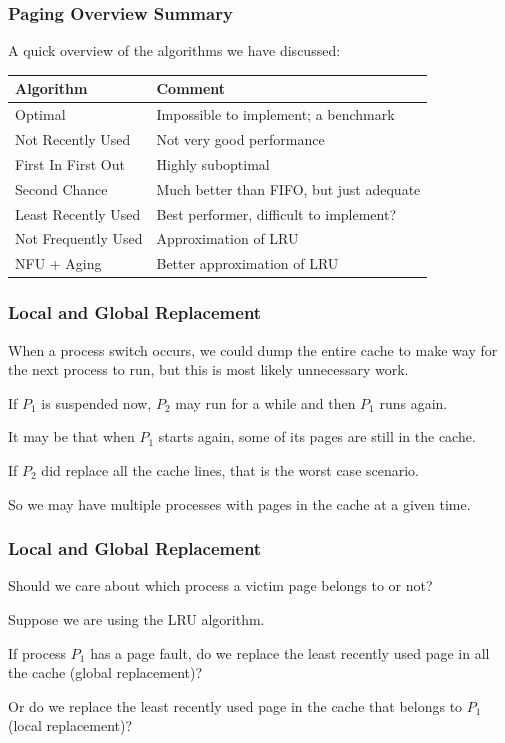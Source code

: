 \begin{frame}
\frametitle{Paging Overview Summary}

A quick overview of the algorithms we have discussed:

\begin{center}
\begin{tabular}{l|l}
	\textbf{Algorithm} & \textbf{Comment} \\ \hline
	Optimal & Impossible to implement; a benchmark\\
	Not Recently Used &  Not very good performance \\
	First In First Out & Highly suboptimal \\
	Second Chance & Much better than FIFO, but just adequate \\
	Least Recently Used & Best performer, difficult to implement? \\
	Not Frequently Used & Approximation of LRU \\
	NFU + Aging & Better approximation of LRU\\
\end{tabular}
\end{center}


\end{frame}

\begin{frame}
\frametitle{Local and Global Replacement}

When a process switch occurs, we could dump the entire cache to make way for the next process to run, but this is most likely unnecessary work. 

If $P_{1}$ is suspended now, $P_{2}$ may run for a while and then $P_{1}$ runs again.

It may be that when $P_{1}$ starts again, some of its pages are still in the cache.

If $P_{2}$ did replace all the cache lines, that is the worst case scenario. 

So we may have multiple processes with pages in the cache at a given time.

\end{frame}

\begin{frame}
\frametitle{Local and Global Replacement}

Should we care about which process a victim page belongs to or not? 

Suppose we are using the LRU algorithm. 

If process $P_{1}$ has a page fault, do we replace the least recently used page in all the cache (global replacement)? 

Or do we replace the least recently used page in the cache that belongs to $P_{1}$ (local replacement)?


\end{frame}

